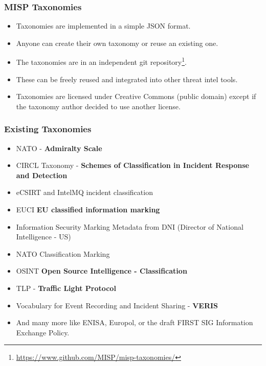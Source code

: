 \begin{frame}
\frametitle{MISP Taxonomies}
\begin{itemize}
\item Taxonomies are implemented in a simple JSON format.
\item Anyone can create their own taxonomy or reuse an existing one.
\item The taxonomies are in an independent git repository\footnote{\url{https://www.github.com/MISP/misp-taxonomies/}}.
\item These can be freely reused and integrated into other threat intel tools.
\item Taxonomies are licensed under Creative Commons (public domain) except if the taxonomy author decided to use another license.
\end{itemize}
\end{frame}

\begin{frame}
\frametitle{Existing Taxonomies}
\begin{itemize}
\item NATO - {\bf Admiralty Scale}
\item CIRCL Taxonomy - {\bf Schemes of Classification in Incident Response and Detection}
\item eCSIRT and IntelMQ incident classification
\item EUCI {\bf EU classified information marking}
\item Information Security Marking Metadata from DNI (Director of National Intelligence - US)
\item NATO Classification Marking
\item OSINT {\bf Open Source Intelligence - Classification}
\item TLP - {\bf Traffic Light Protocol}
\item Vocabulary for Event Recording and Incident Sharing - {\bf VERIS}
\item And many more like ENISA, Europol, or the draft FIRST SIG Information Exchange Policy.
\end{itemize}
\end{frame}


